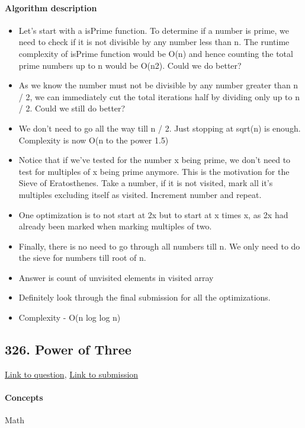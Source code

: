 \documentclass[11pt]{book}
\begin{document}
\paragraph{Algorithm description}
\begin{itemize}
    \item Let's start with a isPrime function. To determine if a number is prime, we need to check if it is not divisible by any number less than n. The runtime complexity of isPrime function would be O(n) and hence counting the total prime numbers up to n would be O(n2). Could we do better?
    \item As we know the number must not be divisible by any number greater than n / 2, we can immediately cut the total iterations half by dividing only up to n / 2. Could we still do better?
    \item We don't need to go all the way till n / 2. Just stopping at sqrt(n) is enough. Complexity is now O(n to the power 1.5)
    \item Notice that if we've tested for the number x being prime, we don't need to test for multiples of x being prime anymore.
    This is the motivation for the Sieve of Eratosthenes. Take a number, if it is not visited, mark all it's multiples excluding itself as visited. Increment number and repeat.
    \item One optimization is to not start at 2x but to start at x times x, as 2x had already been marked when marking multiples of two.
    \item Finally, there is no need to go through all numbers till n. We only need to do the sieve for numbers till root of n.
    \item Answer is count of unvisited elements in visited array
    \item Definitely look through the final submission for all the optimizations.
    \item Complexity - O(n log log n)
\end{itemize}

\subsection{326. Power of Three}
\href{https://leetcode.com/problems/power-of-three/solution/}{Link to question},
\href{https://leetcode.com/submissions/detail/335722204/}{Link to submission}
\paragraph{Concepts}
Math
\end{document}
